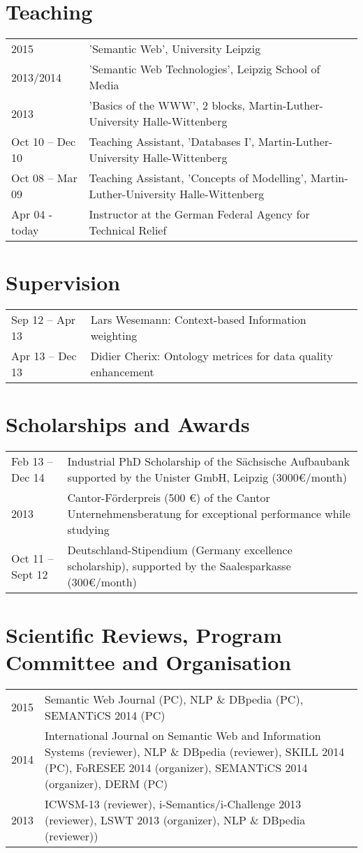 \section*{Teaching}
\begin{tabular}{p{3cm}p{10cm}}	
2015		    & 'Semantic Web', University Leipzig\\
2013/2014	    & 	'Semantic Web Technologies', Leipzig School of Media\\
2013		    & 'Basics of the WWW', 2 blocks, Martin-Luther-University Halle-Wittenberg\\
Oct 10 – Dec 10	& 	Teaching Assistant, 'Databases I', Martin-Luther-University Halle-Wittenberg\\
Oct 08 – Mar 09	& 	Teaching Assistant, 'Concepts of Modelling', Martin-Luther-University Halle-Wittenberg\\
Apr 04 - today	& Instructor at the German Federal Agency for Technical Relief\\
\end{tabular}

\section*{Supervision}
\begin{tabular}{p{3cm}p{10cm}}	
Sep 12 – Apr 13 	& 	Lars Wesemann: Context-based Information weighting\\
Apr 13 – Dec 13 	& 	Didier Cherix: Ontology metrices for data quality enhancement
\end{tabular}

\section*{Scholarships and Awards}
\begin{tabular}{p{3cm}p{10cm}}	
Feb 13 – Dec 14 	& 	Industrial PhD Scholarship of the Sächsische Aufbaubank supported by the Unister GmbH, Leipzig (3000€/month)\\
2013	        	&   Cantor-Förderpreis (500 €) of the Cantor Unternehmensberatung for exceptional performance while studying\\
Oct 11 – Sept 12 	& 	Deutschland-Stipendium (Germany excellence scholarship), supported by the Saalesparkasse (300€/month)\\
\end{tabular}

\section*{Scientific Reviews, Program Committee and Organisation}
\begin{tabular}{p{3cm}p{10cm}}	
2015        & Semantic Web Journal (PC), NLP \& DBpedia (PC), SEMANTiCS 2014 (PC)\\
2014		& International Journal on Semantic Web and Information Systems (reviewer), NLP \& DBpedia (reviewer), SKILL 2014 (PC), FoRESEE 2014 (organizer), SEMANTiCS 2014 (organizer), DERM (PC)\\
2013		& ICWSM-13 (reviewer), i-Semantics/i-Challenge 2013 (reviewer), LSWT 2013 (organizer), NLP \& DBpedia (reviewer))\\
\end{tabular}

